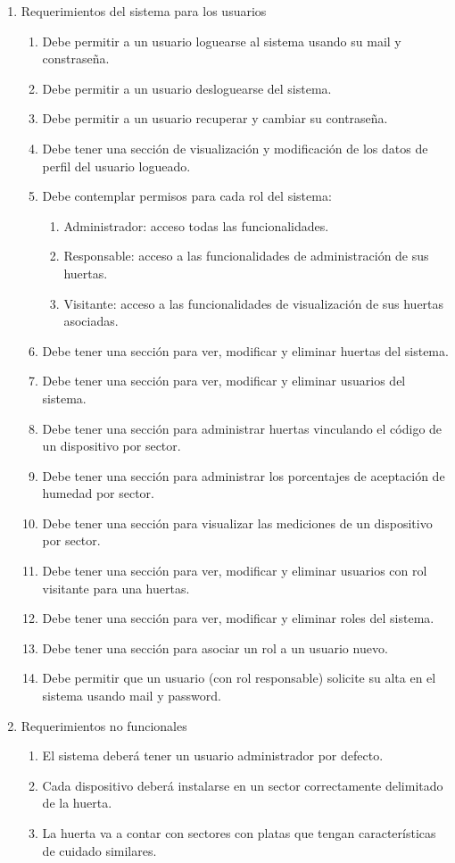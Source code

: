 \documentclass[
11pt, %
codirector, %
]{charter}
\begin{document}
\begin{enumerate}
	\item Requerimientos del sistema para los usuarios
		\begin{enumerate}
			\item Debe permitir a un usuario loguearse al sistema usando su mail y constraseña.
			\item Debe permitir a un usuario desloguearse del sistema.
			\item Debe permitir a un usuario recuperar y cambiar su contraseña.
			\item Debe tener una sección de visualización y modificación de los datos de perfil del usuario logueado.
			\item Debe contemplar permisos para cada rol del sistema:
			\begin{enumerate}
			\item Administrador: acceso todas las funcionalidades.
			\item Responsable: acceso a las funcionalidades de administración de sus huertas.
			\item Visitante: acceso a las funcionalidades de visualización de sus huertas asociadas.
			\end{enumerate}
			\item Debe tener una sección para ver, modificar y eliminar huertas del sistema.
			\item Debe tener una sección para ver, modificar y eliminar usuarios del sistema.
			\item Debe tener una sección para administrar huertas vinculando el código de un dispositivo por sector.
			\item Debe tener una sección para administrar los porcentajes de aceptación de humedad por sector.
			\item Debe tener una sección para visualizar las mediciones de un dispositivo por sector.
			\item Debe tener una sección para ver, modificar y eliminar usuarios con rol visitante para una huertas.
			\item Debe tener una sección para ver, modificar y eliminar roles del sistema.
			\item Debe tener una sección para asociar un rol a un usuario nuevo.
			\item Debe permitir que un usuario (con rol responsable) solicite su alta en el sistema usando mail y password.
		\end{enumerate}		
		
	\item Requerimientos no funcionales
		\begin{enumerate}
			\item El sistema deberá tener un usuario administrador por defecto.
			\item Cada dispositivo deberá instalarse en un sector correctamente delimitado de la huerta.
			\item La huerta va a contar con sectores con platas que tengan características de cuidado similares.
		\end{enumerate}
		
\end{enumerate}
\end{document}
